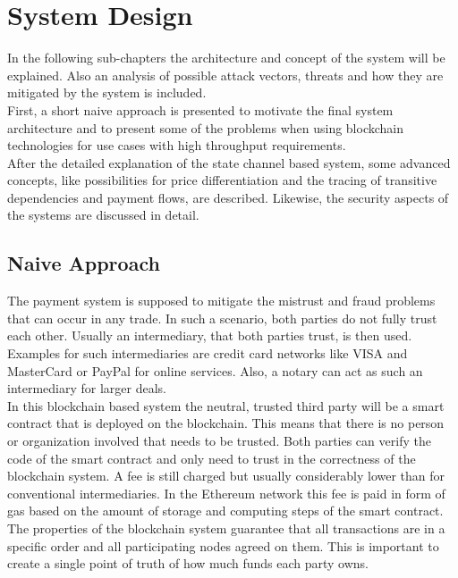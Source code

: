 \documentclass[a4paper,12pt]{scrartcl}
\begin{document}
\newpage
\section{System Design}

In the following sub-chapters the architecture and concept of the system will be explained. Also an analysis of possible attack vectors, threats and how they are mitigated by the system is included.\\
First, a short naive approach is presented to motivate the final system architecture and to present some of the problems when using blockchain technologies for use cases with high throughput requirements.\\
After the detailed explanation of the state channel based system, some advanced concepts, like possibilities for price differentiation and the tracing of transitive dependencies and payment flows, are described. Likewise, the security aspects of the systems are discussed in detail.

\subsection{Naive Approach}

The payment system is supposed to mitigate the mistrust and fraud problems that can occur in any trade. In such a scenario, both parties do not fully trust each other. Usually an intermediary, that both parties trust, is then used. Examples for such intermediaries are credit card networks like VISA and MasterCard or PayPal for online services. Also, a notary can act as such an intermediary for larger deals.\\

In this blockchain based system the neutral, trusted third party will be a smart contract that is deployed on the blockchain. This means that there is no person or organization involved that needs to be trusted. Both parties can verify the code of the smart contract and only need to trust in the correctness of the blockchain system. A fee is still charged but usually considerably lower than for conventional intermediaries. In the Ethereum network this fee is paid in form of gas based on the amount of storage and computing steps of the smart contract.\\
The properties of the blockchain system guarantee that all transactions are in a specific order and all participating nodes agreed on them. This is important to create a single point of truth of how much funds each party owns.\\
\end{document}
